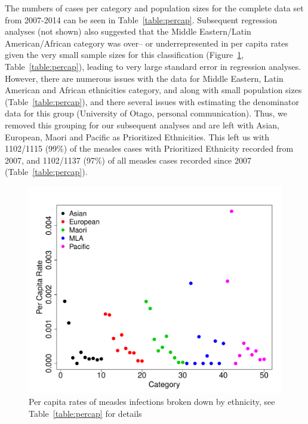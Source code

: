 \documentclass{article}
\begin{document}
The numbers of cases per category and population sizes for the complete data set from 2007-2014 can be seen in Table~\ref{table:percap}. Subsequent regression analyses (not shown) also suggested that the Middle Eastern/Latin American/African category was over-- or underrepresented in per capita rates given the very small sample sizes for this classification (Figure~\ref{fig:percap}, Table~\ref{table:percap}), leading to very large standard error in regression analyses. However, there are numerous issues with the data for Middle Eastern, Latin American and African ethnicities category, and along with small population sizes (Table~\ref{table:percap}), and there several issues with estimating the denominator data for this group (University of Otago, personal communication). Thus, we removed this grouping for our subsequent analyses and are left with Asian, European, Maori and Pacific as Prioritized Ethnicities. This left us with 1102/1115 (99\%) of the measles cases with Prioritized Ethnicity recorded from 2007, and 1102/1137 (97\%) of all measles cases recorded since 2007 (Table~\ref{table:percap}).

\begin{figure}[h!]
\begin{center}
\includegraphics{draftfinalreport-023}
\end{center}
\caption{Per capita rates of measles infections broken down by ethnicity, see Table~\ref{table:percap} for details}
\label{fig:percap}
\end{figure}
\end{document}
